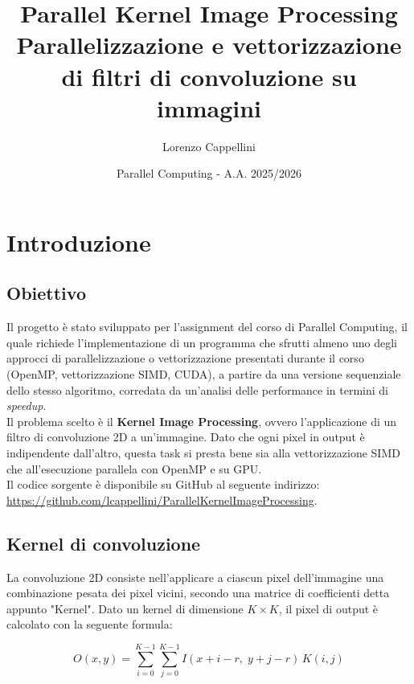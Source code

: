 \documentclass{article}
\title{Parallel Kernel Image Processing \\ \vspace{0.5cm} {Parallelizzazione e vettorizzazione di filtri di convoluzione su immagini}}
\author{Lorenzo Cappellini}
\date{Parallel Computing - A.A. 2025/2026}
\begin{document}
\maketitle

\newpage

\tableofcontents

\newpage
\section{Introduzione}

\subsection{Obiettivo}
Il progetto è stato sviluppato per l'assignment del corso di Parallel Computing, il quale richiede l'implementazione di un programma che sfrutti almeno uno degli approcci di parallelizzazione o vettorizzazione presentati durante il corso (OpenMP, vettorizzazione SIMD, CUDA), a partire da una versione sequenziale dello stesso algoritmo, corredata da un'analisi delle performance in termini di \textit{speedup}.
\\

\noindent Il problema scelto è il \textbf{Kernel Image Processing}, ovvero l'applicazione di un filtro di convoluzione 2D a un'immagine. Dato che ogni pixel in output è indipendente dall'altro, questa task si presta bene sia alla vettorizzazione SIMD che all'esecuzione parallela con OpenMP e su GPU.
\\

\noindent Il codice sorgente è disponibile su GitHub al seguente indirizzo:\\
\href{https://github.com/lcappellini/ParallelKernelImageProcessing}{https://github.com/lcappellini/ParallelKernelImageProcessing}.

\subsection{Kernel di convoluzione}
\label{subsec:theory}

La convoluzione 2D consiste nell'applicare a ciascun pixel dell'immagine una combinazione pesata dei pixel vicini, secondo una matrice di coefficienti detta appunto "Kernel". Dato un kernel di dimensione $K \times K$, il pixel di output è calcolato con la seguente formula:

\begin{equation}
    O(x,y) =
    \sum_{i=0}^{K-1}
    \sum_{j=0}^{K-1}
    I(x+i-r,\;y+j-r)\,K(i,j)
\end{equation}
\end{document}
